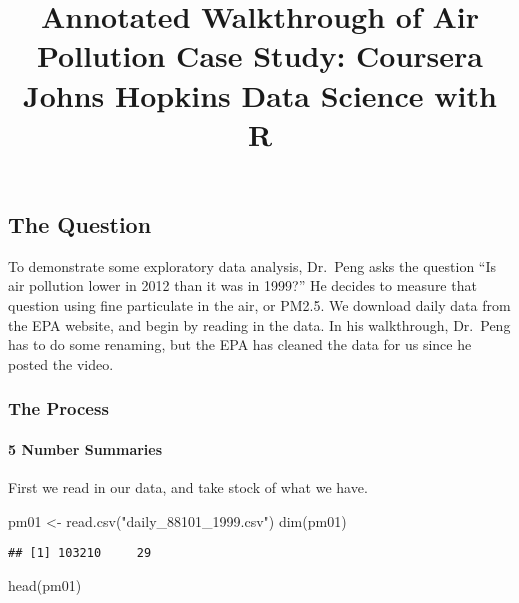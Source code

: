 \documentclass[
]{article}
\title{Annotated Walkthrough of Air Pollution Case Study: Coursera Johns
Hopkins Data Science with R}
\author{}
\date{\vspace{-2.5em}}
\newenvironment{Shaded}{\begin{snugshade}}{\end{snugshade}}
\newcommand{\FunctionTok}[1]{\textcolor[rgb]{0.00,0.00,0.00}{#1}}
\newcommand{\NormalTok}[1]{#1}
\newcommand{\OtherTok}[1]{\textcolor[rgb]{0.56,0.35,0.01}{#1}}
\newcommand{\StringTok}[1]{\textcolor[rgb]{0.31,0.60,0.02}{#1}}
\begin{document}
\maketitle

\hypertarget{the-question}{%
\subsection{The Question}\label{the-question}}

To demonstrate some exploratory data analysis, Dr.~Peng asks the
question ``Is air pollution lower in 2012 than it was in 1999?'' He
decides to measure that question using fine particulate in the air, or
PM2.5. We download daily data from the EPA website, and begin by reading
in the data. In his walkthrough, Dr.~Peng has to do some renaming, but
the EPA has cleaned the data for us since he posted the video.

\hypertarget{the-process}{%
\subsubsection{The Process}\label{the-process}}

\hypertarget{number-summaries}{%
\paragraph{5 Number Summaries}\label{number-summaries}}

First we read in our data, and take stock of what we have.

\begin{Shaded}
\begin{Highlighting}[]
\NormalTok{pm01 }\OtherTok{\textless{}{-}} \FunctionTok{read.csv}\NormalTok{(}\StringTok{"daily\_88101\_1999.csv"}\NormalTok{)}
\FunctionTok{dim}\NormalTok{(pm01)}
\end{Highlighting}
\end{Shaded}

\begin{verbatim}
## [1] 103210     29
\end{verbatim}

\begin{Shaded}
\begin{Highlighting}[]
\FunctionTok{head}\NormalTok{(pm01)}
\end{Highlighting}
\end{Shaded}
\end{document}
